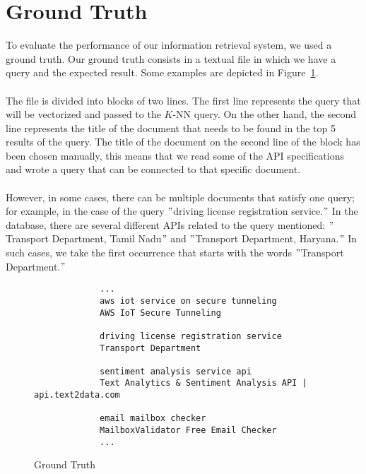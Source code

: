 \section{Ground Truth}\label{sec:ground-truth}
To evaluate the performance of our information retrieval system, we used a ground truth.
Our ground truth consists in a textual file in which we have a query and the expected result.
Some examples are depicted in Figure~\ref{fig:ground-truth}.\\ \\
The file is divided into blocks of two lines.
The first line represents the query that will be vectorized and passed to the $K$-NN query.
On the other hand, the second line represents the title of the document that needs to be found in the top 5 results of the query.
The title of the document on the second line of the block has been chosen manually, this means that we read some of the API specifications and wrote a query that can be connected to that specific document. \\ \\
However, in some cases, there can be multiple documents that satisfy one query; for example, in the case of the query \("\)driving license registration service.\("\)
In the database, there are several different APIs related to the query mentioned: \("\)Transport Department, Tamil Nadu\("\) and \("\)Transport Department, Haryana.\("\)
In such cases, we take the first occurrence that starts with the words \("\)Transport Department.\("\)

\begin{figure}[!h]
    \centering
    \begin{verbatim}
             ...
             aws iot service on secure tunneling
             AWS IoT Secure Tunneling

             driving license registration service
             Transport Department

             sentiment analysis service api
             Text Analytics & Sentiment Analysis API | api.text2data.com

             email mailbox checker
             MailboxValidator Free Email Checker
             ...
    \end{verbatim}
    \caption{Ground Truth}
    \label{fig:ground-truth}
\end{figure}
